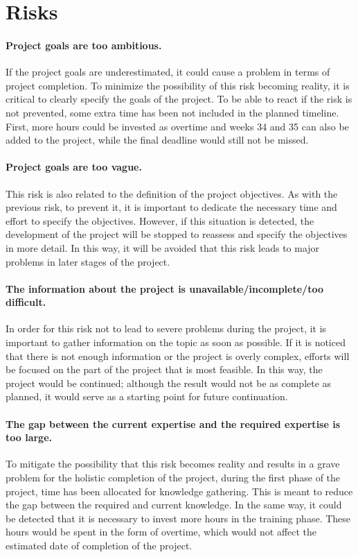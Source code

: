 \section{Risks} %
\paragraph{Project goals are too ambitious.}
If the project goals are underestimated, it could cause a problem in terms of project completion.
To minimize the possibility of this risk becoming reality, it is critical to clearly specify the goals of the project.
To be able to react if the risk is not prevented, some extra time has been not included in the planned timeline.
First, more hours could be invested as overtime and weeks 34 and 35 can also be added to the project, while the final deadline would still not be missed.

\paragraph{Project goals are too vague.}
This risk is also related to the definition of the project objectives. As with the previous risk, to prevent it, it is important to dedicate the necessary time and effort to specify the objectives.
However, if this situation is detected, the development of the project will be stopped to reassess and specify the objectives in more detail.
In this way, it will be avoided that this risk leads to major problems in later stages of the project.

\paragraph{The information about the project is unavailable/incomplete/too difficult.}
In order for this risk not to lead to severe problems during the project, it is important to gather information on the topic as soon as possible.
If it is noticed that there is not enough information or the project is overly complex, efforts will be focused on the part of the project that is most feasible.
In this way, the project would be continued; although the result would not be as complete as planned, it would serve as a starting point for future continuation.

\paragraph{The gap between the current expertise and the required expertise is too large.}
To mitigate the possibility that this risk becomes reality and results in a grave problem for the holistic completion of the project,
during the first phase of the project, time has been allocated for knowledge gathering. This is meant to reduce the gap between the required and current knowledge.
In the same way, it could be detected that it is necessary to invest more hours in the training phase.
These hours would be spent in the form of overtime, which would not affect the estimated date of completion of the project.

